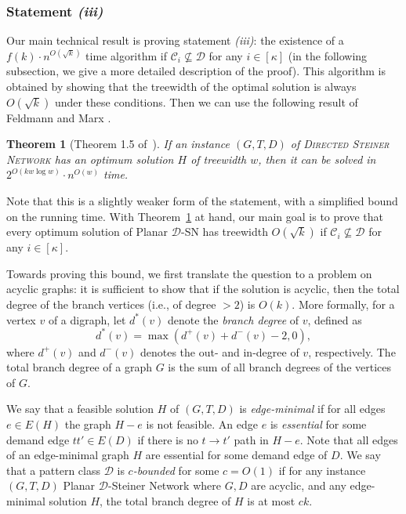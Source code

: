 \documentclass[a4paper,11pt]{article}
\newcommand{\calD}{\mathcal{D}}
\theoremstyle{plain}
\newtheorem{theorem}{Theorem}[section]
\newtheorem{identification rule}{Identification Rule}
\theoremstyle{definition}
\theoremstyle{remark}
\newcommand{\Dsnfull}{{\sc Planar $\calD$-Steiner Network}\xspace}
\newcommand{\Dsn}{{\sc Planar $\calD$-SN}\xspace}
\begin{document}
\subsubsection*{Statement \textit{(iii)}}

  Our main technical result is proving statement \textit{(iii)}: the existence of a
$f(k)\cdot n^{O(\sqrt{k})}$ time algorithm if
$\mathcal{C}_i\not\subseteq \calD$ for any $i\in[\kappa]$ (in the following subsection, we give a more detailed description of the proof). This
algorithm is obtained by showing that the treewidth of the
optimal solution is always $O(\sqrt{k})$ under these
conditions. Then we can use the following result of Feldmann and Marx \cite{FeldmannM16}.

  \begin{theorem}[Theorem 1.5 of~\cite{FeldmannM16}]\label{thm:algo_tw}
    If an instance $(G,T,D)$ of \textsc{Directed Steiner Network} has an optimum solution $H$ of treewidth $w$, then it can be solved in $2^{O(kw \log w)} \cdot n^{O(w)}$ time. 
  \end{theorem}
  
  Note that this is a slightly weaker form of the statement, with a simplified bound on the running time. With Theorem~\ref{thm:algo_tw} at hand, our main goal is to prove that every optimum solution of \Dsn has treewidth $O(\sqrt{k})$ if $\mathcal{C}_i\not\subseteq \calD$ for any $i\in [\kappa]$.
  
Towards proving this bound, we first translate the
question to a problem on acyclic graphs: it is sufficient to show that
if the solution is acyclic, then the total degree of the branch
vertices (i.e., of degree $>2$) is $O(k)$. More formally,
for a vertex $v$ of a digraph, let $d^*(v)$ denote the \emph{branch degree} of $v$, defined as 
\[d^*(v)=\max(d^+(v)+d^-(v)-2,0),\]
where $d^+(v)$ and $d^-(v)$ denotes the out- and in-degree of $v$, respectively. The total branch degree of a graph $G$ is the sum of all branch degrees of the vertices of $G$.

We say that a feasible solution $H$ of $(G,T,D)$ is \emph{edge-minimal} if for all edges $e\in E(H)$ the graph $H-e$ is not feasible. An edge $e$ is \emph{essential} for some demand edge $tt'\in E(D)$ if there is no $t\rightarrow t'$ path in $H-e$. Note that all edges of an edge-minimal graph $H$ are essential for some demand edge of $D$.
We say that a pattern class $\calD$ is \emph{$c$-bounded} for some $c=O(1)$ if for any instance $(G,T,D)$ \Dsnfull where $G,D$ are acyclic, and any edge-minimal solution $H$, the total branch degree of $H$ is at most $ck$.
\end{document}
